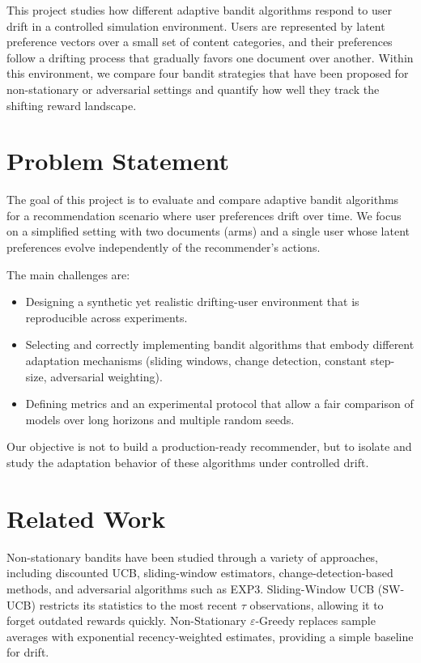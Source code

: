 \documentclass{scrartcl}
\begin{document}
This project studies how different adaptive bandit algorithms respond to user
drift in a controlled simulation environment. Users are represented by latent
preference vectors over a small set of content categories, and their
preferences follow a drifting process that gradually favors one document over
another. Within this environment, we compare four bandit strategies that have
been proposed for non-stationary or adversarial settings and quantify how well
they track the shifting reward landscape.

\section{Problem Statement}

The goal of this project is to evaluate and compare adaptive bandit algorithms
for a recommendation scenario where user preferences drift over time. We focus
on a simplified setting with two documents (arms) and a single user whose
latent preferences evolve independently of the recommender’s actions.

The main challenges are:
\begin{itemize}
	\item Designing a synthetic yet realistic drifting-user environment that
	      is reproducible across experiments.
	\item Selecting and correctly implementing bandit algorithms that embody
	      different adaptation mechanisms (sliding windows, change
	      detection, constant step-size, adversarial weighting).
	\item Defining metrics and an experimental protocol that allow a fair
	      comparison of models over long horizons and multiple random seeds.
\end{itemize}

Our objective is not to build a production-ready recommender, but to isolate
and study the adaptation behavior of these algorithms under controlled drift.

\section{Related Work}

Non-stationary bandits have been studied through a variety of approaches,
including discounted UCB, sliding-window estimators, change-detection-based
methods, and adversarial algorithms such as EXP3.\cite{swucb,epsilon_greedy_ns,
cusumucb,exp3s} Sliding-Window UCB (SW-UCB) restricts its statistics to the most
recent $\tau$ observations, allowing it to forget outdated rewards quickly.
Non-Stationary $\varepsilon$-Greedy replaces sample averages with
exponential recency-weighted estimates, providing a simple baseline for drift.
\end{document}
